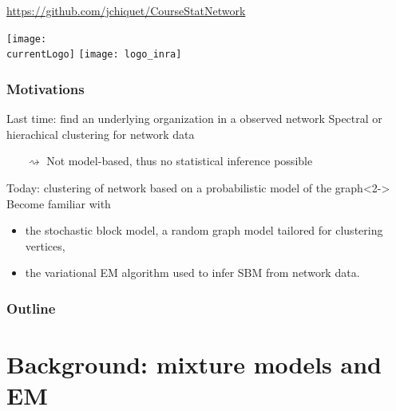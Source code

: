 \documentclass{beamer}\usepackage[]{graphicx}\usepackage[]{color}
\title{\currentCourse}
\subtitle{\huge\currentChapter\normalsize}
\institute{\currentInstitute}
\date{\currentDate}
\def\currentLogo{../common_figs/logo_ensai}
\newcommand{\dotitlepage}{%
  \begin{frame}
    \titlepage
    \vfill
    \begin{center}
        \scriptsize\url{https://github.com/jchiquet/CourseStatNetwork}
    \end{center}
    \vfill
    \texttt{[image: \\currentLogo]}\hfill
    \texttt{[image: logo\_inra]}
  \end{frame}
}
\begin{document}
\dotitlepage

\begin{frame}
  \frametitle{Motivations}

  \begin{block}{Last time: \alert{find an underlying organization in a observed network}}
    Spectral or hierachical clustering for network data \\
    \begin{itemize}
      \item[$\rightsquigarrow$] \alert{Not model-based}, thus no statistical inference possible
    \end{itemize}
  \end{block}

  \begin{block}{Today: \alert{clustering of network based on a probabilistic model of the graph}}<2->
    Become familiar with
    \begin{itemize}
      \item the stochastic block model, a random graph model tailored for clustering vertices,
      \item the variational EM algorithm used to infer SBM from network data.
    \end{itemize}
  \end{block}


\end{frame}

\begin{frame}
  \frametitle{Outline}
  \tableofcontents
\end{frame}

\section{Background: mixture models and EM}
\end{document}
